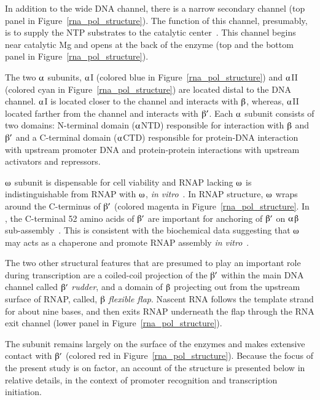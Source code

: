 In addition to the wide DNA channel, there is a narrow secondary
channel (top panel in Figure~\ref{rna_pol_structure}). The
function of this channel, presumably, is to supply the NTP
substrates to the catalytic center~\citep{Zhang1999}. This channel
begins near catalytic Mg and opens at the back of the
enzyme (top and the bottom panel in
Figure~\ref{rna_pol_structure}).



The two $\alphaup$ subunits, $\alphaup$I (colored blue in
Figure~\ref{rna_pol_structure}) and $\alphaup$II (colored cyan in
Figure~\ref{rna_pol_structure}) are located distal to the DNA
channel. $\alphaup$I is located closer to the channel and
interacts with $\betaup$, whereas, $\alphaup$II located farther
from the channel and interacts with $\betaup'$\@. Each $\alphaup$
subunit consists of two domains: N-terminal domain ($\alphaup$NTD)
responsible for interaction with $\betaup$ and $\betaup'$ and a
C-terminal domain ($\alphaup$CTD) responsible for protein-DNA
interaction with upstream promoter DNA and protein-protein
interactions with upstream activators and repressors.

 $\omegaup$ subunit is dispensable for cell viability and
RNAP lacking $\omegaup$ is indistinguishable from RNAP with
$\omegaup$, \emph{in vitro}~\citep{Gentry1989,Kashlev1996}. In
RNAP structure, $\omegaup$ wraps around the C-terminus of
$\betaup'$ (colored magenta in Figure~\ref{rna_pol_structure}. In
, the C-terminal 52 amino acids of $\betaup'$ are
important for anchoring of $\betaup'$ on
$\alphaup$$\betaup$
sub-assembly~\citep{Nedea1999,Christie1996}. This is consistent
with the biochemical data suggesting that  $\omegaup$ may
acts as a chaperone and promote RNAP assembly \emph{in
vitro}~\citep{Mukherjee1999}.

The two other structural features that are presumed to play an
important role during transcription are a coiled-coil projection
of the $\betaup'$ within the main DNA channel called $\betaup'$
\emph{rudder}, and a domain of $\betaup$ projecting out from the
upstream surface of RNAP, called, $\betaup$ \emph{flexible flap}.
Nascent RNA follows the template strand for about nine bases, and
then exits RNAP underneath the flap through the RNA exit channel
(lower panel in Figure~\ref{rna_pol_structure}).

The \s{} subunit remains largely on the surface of the enzymes and
makes extensive contact with $\betaup'$ (colored red in
Figure~\ref{rna_pol_structure}). Because the focus of the present
study is on \s{} factor, an account of the \s{} structure is
presented below in relative details, in the context of promoter
recognition and transcription initiation.

